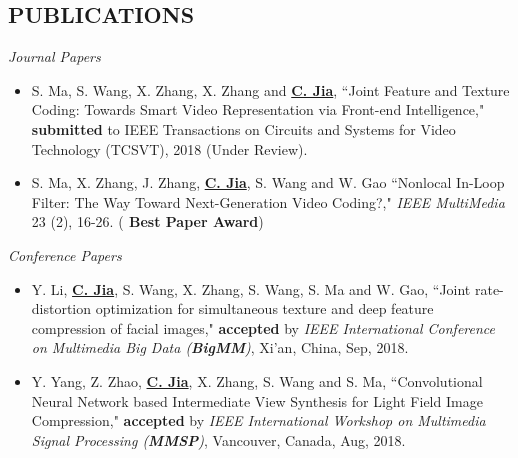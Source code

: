 \documentclass[margin, 10pt]{res} %
\begin{document}
\begin{resume}

\section{PUBLICATIONS}
{\sl Journal Papers}
\begin{itemize}
\item{S. Ma, S. Wang, X. Zhang, X. Zhang and \underline{\bf C. Jia}, ``Joint Feature and Texture Coding: Towards Smart Video Representation via Front-end Intelligence," {\bf submitted} to IEEE Transactions on Circuits and Systems for Video Technology (TCSVT), 2018 (Under Review).}
\item{S. Ma, X. Zhang, J. Zhang, \underline{\bf C. Jia}, S. Wang and W. Gao ``Nonlocal In-Loop Filter: The Way Toward Next-Generation Video Coding?," {\em {IEEE} MultiMedia} 23 (2), 16-26.} ({\bf{\color{red} Best Paper Award}})
\end{itemize}

{\sl Conference Papers}
\begin{itemize}
\item{Y. Li, \underline{\bf C. Jia}, S. Wang, X. Zhang, S. Wang, S. Ma and W. Gao, ``Joint rate-distortion optimization for simultaneous texture and deep feature compression of facial images," {\bf accepted} by {\em IEEE International Conference on Multimedia Big Data ({\bf BigMM})}, Xi'an, China, Sep, 2018. }

\item{Y. Yang, Z. Zhao, \underline{\bf C. Jia}, X. Zhang, S. Wang and S. Ma, ``Convolutional Neural Network based Intermediate View Synthesis for Light Field Image Compression," {\bf accepted} by {\em IEEE International Workshop on Multimedia Signal Processing ({\bf MMSP})}, Vancouver, Canada, Aug, 2018. }


\end{itemize}
\end{resume}
\end{document}
